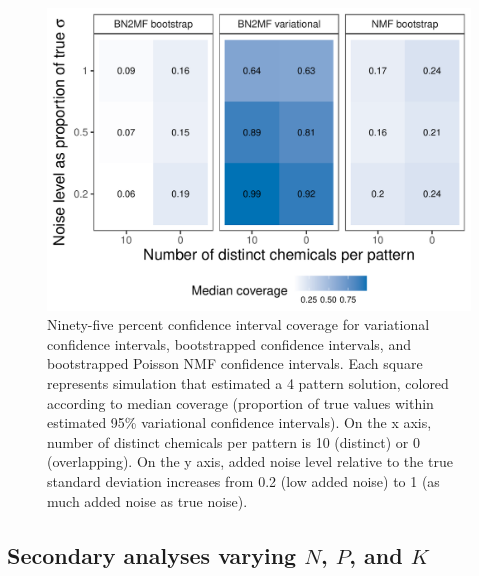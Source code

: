 \clearpage
\begin{figure}
\caption{Ninety-five percent confidence interval coverage for variational confidence intervals, bootstrapped \bnmf confidence intervals, and bootstrapped Poisson NMF confidence intervals. Each square represents simulation that estimated a 4 pattern solution, colored according to median coverage (proportion of true values within estimated 95\% variational confidence intervals). On the x axis, number of distinct chemicals per pattern is 10 (distinct) or 0 (overlapping). On the y axis, added noise level relative to the true standard deviation increases from 0.2 (low added noise) to 1 (as much added noise as true noise).}
\label{fig:boot_coverage}
\centering
\includegraphics[scale = 0.7]{./figures/bootstrap_coverage.pdf}
\end{figure}

\clearpage
\subsection{Secondary analyses varying $N$, $P$, and $K$}
